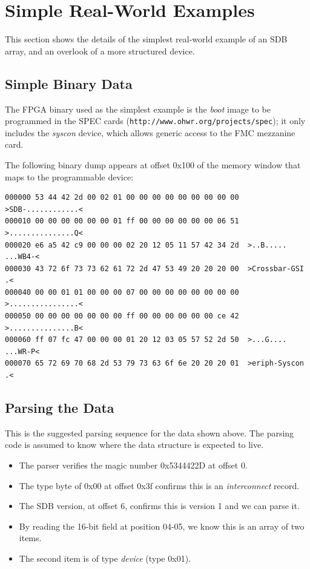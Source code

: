 \documentclass[a4paper, 12pt]{article}
\begin{document}
\section{Simple Real-World Examples}

This section shows the details of the simplest real-world example of an SDB array,
and an overlook of a more structured device.

\subsection{Simple Binary Data}

The FPGA binary used as the simplest example is the \textit{boot} image to be
programmed in the SPEC cards
(\texttt{http://www.ohwr.org/projects/spec}); it only includes the
\textit{syscon} device, which allows generic access to the FMC
mezzanine card.

The following binary dump appears at offset 0x100 of the memory window
that maps to the programmable device:

\footnotesize
\begin{verbatim}
000000 53 44 42 2d 00 02 01 00 00 00 00 00 00 00 00 00  >SDB-............<
000010 00 00 00 00 00 00 01 ff 00 00 00 00 00 00 06 51  >...............Q<
000020 e6 a5 42 c9 00 00 00 02 20 12 05 11 57 42 34 2d  >..B..... ...WB4-<
000030 43 72 6f 73 73 62 61 72 2d 47 53 49 20 20 20 00  >Crossbar-GSI   .<
000040 00 00 01 01 00 00 00 07 00 00 00 00 00 00 00 00  >................<
000050 00 00 00 00 00 00 00 ff 00 00 00 00 00 00 ce 42  >...............B<
000060 ff 07 fc 47 00 00 00 01 20 12 03 05 57 52 2d 50  >...G.... ...WR-P<
000070 65 72 69 70 68 2d 53 79 73 63 6f 6e 20 20 20 01  >eriph-Syscon   .<
\end{verbatim}
\normalsize

\subsection{Parsing the Data}

This is the suggested parsing sequence for the data shown above. The
parsing code is assumed to know where the data structure is expected to live.

\begin{itemize}
\item The parser verifies the magic number 0x5344422D at offset 0.
\item The type byte of 0x00 at offset 0x3f confirms this is an \textit{interconnect} record.
\item The SDB version, at offset 6, confirms this is version 1 and we can parse it.
\item By reading the 16-bit field at position 04-05, we know this is an array of two items.
\item The second item is of type \textit{device} (type 0x01).
\end{itemize}
\end{document}
